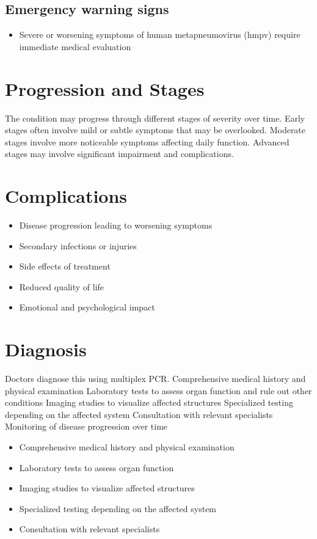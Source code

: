\subsection{Emergency warning signs}
\begin{itemize}[noitemsep]
  \item Severe or worsening symptoms of human metapneumovirus (hmpv) require immediate medical evaluation
\end{itemize}
\section{Progression and Stages}
The condition may progress through different stages of severity over time. Early stages often involve mild or subtle symptoms that may be overlooked. Moderate stages involve more noticeable symptoms affecting daily function. Advanced stages may involve significant impairment and complications.
\section{Complications}
\begin{itemize}[noitemsep]
  \item Disease progression leading to worsening symptoms
  \item Secondary infections or injuries
  \item Side effects of treatment
  \item Reduced quality of life
  \item Emotional and psychological impact
\end{itemize}
\section{Diagnosis}
Doctors diagnose this using multiplex PCR. Comprehensive medical history and physical examination Laboratory tests to assess organ function and rule out other conditions Imaging studies to visualize affected structures Specialized testing depending on the affected system Consultation with relevant specialists Monitoring of disease progression over time

\begin{itemize}[noitemsep]
  \item Comprehensive medical history and physical examination
  \item Laboratory tests to assess organ function
  \item Imaging studies to visualize affected structures
  \item Specialized testing depending on the affected system
  \item Consultation with relevant specialists
\end{itemize}
